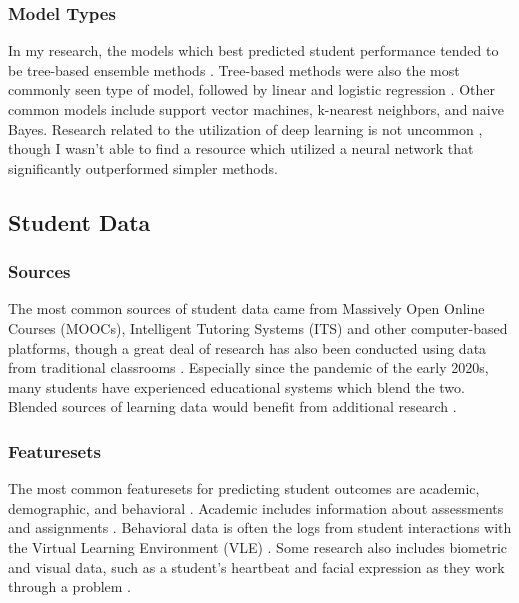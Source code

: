 \documentclass{article}
\begin{document}
        \subsubsection{Model Types}
            In my research, the models which best predicted student performance tended to be tree-based ensemble methods \cite{explore2021,engage2014,assign2021esteban}.
            Tree-based methods were also the most commonly seen type of model, followed by linear and logistic regression \cite{assign2021esteban}.
            Other common models include support vector machines, k-nearest neighbors, and naive Bayes.
            Research related to the utilization of deep learning is not uncommon \cite{explore2021,assign2021esteban}, though I wasn't able to find a resource which utilized a neural network that significantly outperformed simpler methods.

    \subsection{Student Data}
        \subsubsection{Sources}
            The most common sources of student data came from Massively Open Online Courses (MOOCs), Intelligent Tutoring Systems (ITS) and other computer-based platforms,
            though a great deal of research has also been conducted using data from traditional classrooms \cite{educate2019,early2021,assign2021esteban,explore2015}.
            Especially since the pandemic of the early 2020s, many students have experienced educational systems which blend the two.
            Blended sources of learning data would benefit from additional research \cite{educate2019,early2021}.

        \subsubsection{Featuresets}
            The most common featuresets for predicting student outcomes are academic, demographic, and behavioral \cite{engage2014,eval2018,early2019,assign2021esteban,compare2015}.
            Academic includes information about assessments and assignments \cite{assign2021esteban}.
            Behavioral data is often the logs from student interactions with the Virtual Learning Environment (VLE) \cite{early2019,assign2021esteban}.
            Some research also includes biometric and visual data, such as a student's heartbeat and facial expression as they work through a problem \cite{assign2021chango}.
\end{document}
